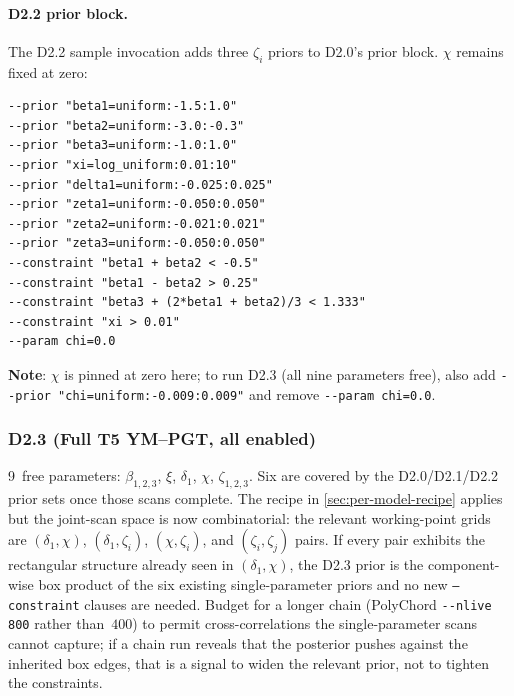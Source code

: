 \paragraph{D2.2 prior block.}
The D2.2 sample invocation adds three $\zeta_i$ priors to D2.0's
prior block.  $\chi$ remains fixed at zero:
\begin{lstlisting}[basicstyle=\ttfamily\small]
--prior "beta1=uniform:-1.5:1.0"
--prior "beta2=uniform:-3.0:-0.3"
--prior "beta3=uniform:-1.0:1.0"
--prior "xi=log_uniform:0.01:10"
--prior "delta1=uniform:-0.025:0.025"
--prior "zeta1=uniform:-0.050:0.050"
--prior "zeta2=uniform:-0.021:0.021"
--prior "zeta3=uniform:-0.050:0.050"
--constraint "beta1 + beta2 < -0.5"
--constraint "beta1 - beta2 > 0.25"
--constraint "beta3 + (2*beta1 + beta2)/3 < 1.333"
--constraint "xi > 0.01"
--param chi=0.0
\end{lstlisting}
\textbf{Note}: $\chi$ is pinned at zero here; to run D2.3
(all nine parameters free), also add
\verb|--prior "chi=uniform:-0.009:0.009"| and remove
\verb|--param chi=0.0|.

\subsubsection*{D2.3 (Full T5 YM--PGT, all enabled)}
\label{sec:d23-priors}

9~free parameters: $\beta_{1,2,3}$, $\xi$, $\delta_1$, $\chi$,
$\zeta_{1,2,3}$.  Six are covered by the D2.0/D2.1/D2.2 prior sets
once those scans complete.  The recipe in \cref{sec:per-model-recipe}
applies but the joint-scan space is now combinatorial: the relevant
working-point grids are
$(\delta_1,\chi)$, $(\delta_1,\zeta_i)$, $(\chi,\zeta_i)$, and
$(\zeta_i,\zeta_j)$ pairs.  If every pair exhibits the rectangular
structure already seen in $(\delta_1,\chi)$, the D2.3 prior is the
component-wise box product of the six existing single-parameter
priors and no new \texttt{--constraint} clauses are needed.  Budget
for a longer chain (PolyChord \verb|--nlive 800| rather than~$400$)
to permit cross-correlations the single-parameter scans cannot
capture; if a chain run reveals that the posterior pushes against
the inherited box edges, that is a signal to widen the relevant
prior, not to tighten the constraints.

